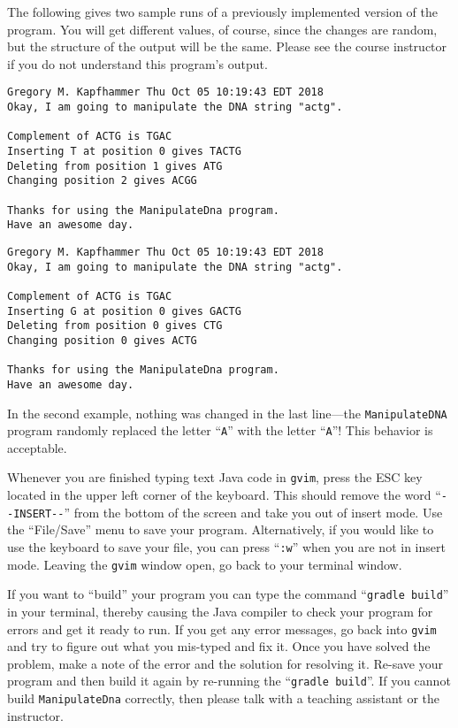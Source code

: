\documentclass[11pt]{article}
\newcommand{\mainprogram}{\lstinline{ManipulateDna}}
\newcommand{\gradlebuild}{\command{gradle build}}
\newcommand{\command}[1]{``\lstinline{#1}''}
\newcommand{\program}[1]{\lstinline{#1}}
\newcommand{\option}[1]{``{#1}''}
\newcommand{\step}[1]{``{#1}''}
\begin{document}
The following gives two sample runs of a previously implemented version of the
program. You will get different values, of course, since the changes are random,
but the structure of the output will be the same. Please see the course
instructor if you do not understand this program's output.

\begin{verbatim}
Gregory M. Kapfhammer Thu Oct 05 10:19:43 EDT 2018
Okay, I am going to manipulate the DNA string "actg".

Complement of ACTG is TGAC
Inserting T at position 0 gives TACTG
Deleting from position 1 gives ATG
Changing position 2 gives ACGG

Thanks for using the ManipulateDna program.
Have an awesome day.
\end{verbatim}

\begin{verbatim}
Gregory M. Kapfhammer Thu Oct 05 10:19:43 EDT 2018
Okay, I am going to manipulate the DNA string "actg".

Complement of ACTG is TGAC
Inserting G at position 0 gives GACTG
Deleting from position 0 gives CTG
Changing position 0 gives ACTG

Thanks for using the ManipulateDna program.
Have an awesome day.
\end{verbatim}

In the second example, nothing was changed in the last line---the {\tt ManipulateDNA} program randomly replaced the
letter ``{\tt A}'' with the letter ``{\tt A}''! This behavior is acceptable.

Whenever you are finished typing text Java code in \program{gvim}, press the ESC key located in the upper left corner of
the keyboard. This should remove the word \command{--INSERT--} from the bottom of the screen and take you out of insert
mode. Use the \option{File/Save} menu to save your program. Alternatively, if you would like to use the keyboard to save
your file, you can press \command{:w} when you are not in insert mode. Leaving the {\tt gvim} window open, go back to
your terminal window.

If you want to \step{build} your program you can type the command \gradlebuild{} in your terminal, thereby causing the
Java compiler to check your program for errors and get it ready to run. If you get any error messages, go back into
\program{gvim} and try to figure out what you mis-typed and fix it. Once you have solved the problem, make a note of the
error and the solution for resolving it. Re-save your program and then build it again by re-running the \gradlebuild{}.
If you cannot build \mainprogram{} correctly, then please talk with a teaching assistant or the instructor.
\end{document}
